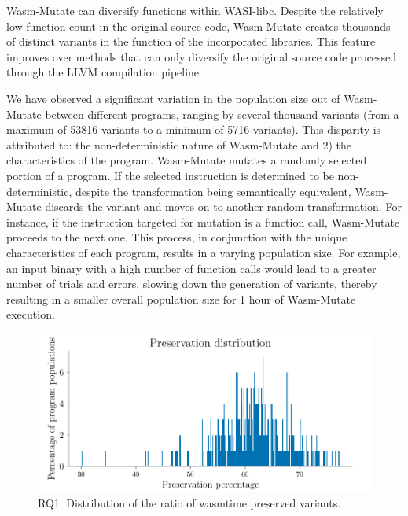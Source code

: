 \documentclass[a4paper,fleqn]{cas-dc}
\newcommand*\badge[1]{ \colorbox{red}{\color{white}#1}}
\newcommand{\tool}{{\sc Wasm-Mutate}\xspace}
\newcommand{\todo}[1]{%
\refstepcounter{todo}
\noindent\textbf{\badge{TODO}} {\color{red}#1}
\addcontentsline{td}{todo}
{\color{red}\thesection.\thetodo\xspace #1}}
\begin{document}
\tool can diversify functions within WASI-libc. 
Despite the relatively low function count in the original source code,  \tool creates thousands of distinct variants in the function of the incorporated libraries. 
This feature improves over methods that can only diversify the original source code processed through the LLVM compilation pipeline \cite{arteaga2020crow}. 



We have observed a significant variation in the population size out of \tool between different programs, ranging by several thousand variants (from a maximum of 53816 variants to a minimum of 5716 variants).
This disparity is attributed to:
the non-deterministic nature of \tool and 2) the characteristics of the program. 
\tool mutates a randomly selected portion of a program. 
If the selected instruction is determined to be non-deterministic, despite the transformation being semantically equivalent, \tool discards the variant and moves on to another random transformation.
For instance, if the instruction targeted for mutation is a function call, \tool proceeds to the next one.
This process, in conjunction with the unique characteristics of each program, results in a varying population size. 
For example, an input binary with a high number of function calls would lead to a greater number of trials and errors, slowing down the generation of variants, thereby resulting in a smaller overall population size for 1 hour of \tool execution.





\begin{figure}
    \centering
    \includegraphics[width=\linewidth]{plots/rq1/preservation.pdf}
    \caption{RQ1: Distribution of the ratio of wasmtime preserved variants.}
  \label{rq1:plot:preservation}
\end{figure}
\end{document}
